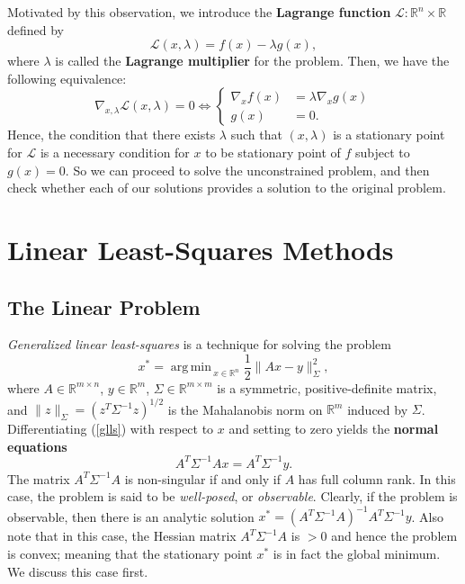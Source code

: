 \documentclass[reqno]{amsart}
\DeclareMathOperator*{\argmin}{arg\,min\,}
\numberwithin{equation}{section}
\begin{document}
Motivated by this observation, we introduce the \textbf{Lagrange function} $\mathcal L :
\mathbb R^n \times \mathbb R$ defined by
$$
\mathcal L(x,\lambda) = f(x) - \lambda g(x),
$$
where $\lambda$ is called the \textbf{Lagrange multiplier} for the problem. Then, we have
the following equivalence:
$$
    \nabla_{x, \lambda} \mathcal L (x,\lambda) = 0 \iff
    \begin{cases}
        \nabla_x f(x) &= \lambda \nabla_x g(x) \\
        g(x)          &= 0.
    \end{cases}
$$
Hence, the condition that there exists $\lambda$ such that $(x,\lambda)$ is a stationary point
for $\mathcal L$ is a necessary condition for $x$ to be stationary point of $f$ subject to
$g(x) = 0$. So we can proceed to solve the unconstrained problem, and then check whether each of
our solutions provides a solution to the original problem.

\section{Linear Least-Squares Methods}
\subsection{The Linear Problem}

\emph{Generalized linear least-squares} is a technique for solving the problem
\begin{equation}
    x^* = \argmin_{x \in \mathbb R^n} \frac12 \| Ax - y\|_\Sigma^2,
\label{glls}
\end{equation}
where $A \in \mathbb R^{m \times n}$, $y \in \mathbb R^m$, $\Sigma \in \mathbb R^{m \times m}$
is a symmetric, positive-definite matrix, and $\| z \|_\Sigma = (z^T \Sigma^{-1} z)^{1/2}$ is the
Mahalanobis norm on $\mathbb R^m$ induced by $\Sigma$. Differentiating (\ref{glls}) with respect
to $x$ and setting to zero yields the \textbf{normal equations}
\begin{equation}
    A^T \Sigma^{-1} A x = A^T \Sigma^{-1} y.
\label{normal}
\end{equation}
The matrix $A^T \Sigma^{-1} A$ is non-singular if and only if $A$ has full column rank. In this
case, the problem is said to be \emph{well-posed}, or \emph{observable}.
Clearly, if the problem is observable, then there is an analytic solution
$x^* = (A^T \Sigma^{-1} A)^{-1} A^T \Sigma^{-1} y$. Also note that in this case, the Hessian
matrix $A^T \Sigma^{-1} A$ is $>0$ and hence the problem is convex; meaning that the stationary
point $x^*$ is in fact the global minimum. We discuss this case first.
\end{document}
